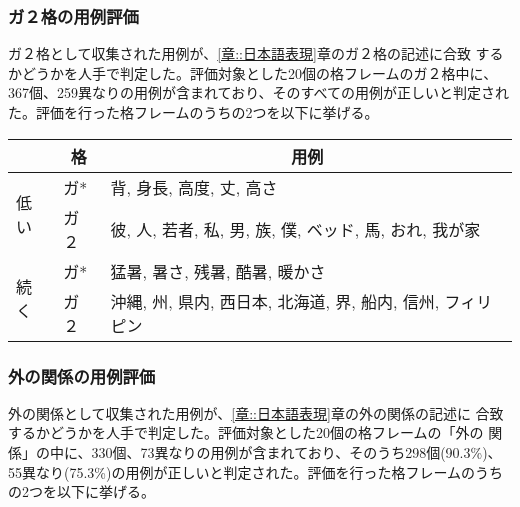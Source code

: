 \documentclass[fleqn]{nlp}
\begin{document}
\subsubsection{ガ２格の用例評価}

ガ２格として収集された用例が、\ref{章::日本語表現}章のガ２格の記述に合致
するかどうかを人手で判定した。評価対象とした20個の格フレームのガ２格中に、
367個、259異なりの用例が含まれており、そのすべての用例が正しいと判定され
た。評価を行った格フレームのうちの2つを以下に挙げる。

\vspace*{2ex}

\begin{tabular}{l|l|l} \hline
                         & \multicolumn{1}{c|}{格} & \multicolumn{1}{c}{用例} \\ \hline
 \multirow{2}{2zw}{低い} & ガ*  & 背, 身長, 高度, 丈, 高さ \\
                         & ガ２ & 彼, 人, 若者, 私, 男, 族, 僕, ベッド, 馬, おれ, 我が家 \\ \hline
 \multirow{2}{2zw}{続く} & ガ*  & 猛暑, 暑さ, 残暑, 酷暑, 暖かさ \\
                         & ガ２ & 沖縄, 州, 県内, 西日本, 北海道, 界, 船内, 信州, フィリピン \\ \hline
\end{tabular}

\vspace*{3ex} 


\subsubsection{外の関係の用例評価}

外の関係として収集された用例が、\ref{章::日本語表現}章の外の関係の記述に
合致するかどうかを人手で判定した。評価対象とした20個の格フレームの「外の
関係」の中に、330個、73異なりの用例が含まれており、そのうち298個(90.3\%)、
55異なり(75.3\%)の用例が正しいと判定された。評価を行った格フレームのうち
の2つを以下に挙げる。

\vspace*{2ex}
\end{document}
